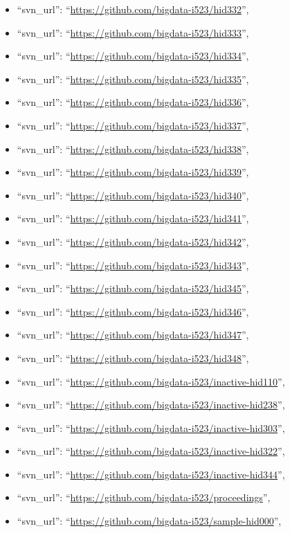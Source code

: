 \begin{itemize}
\item
  ``svn\_url'': ``\url{https://github.com/bigdata-i523/hid332}'',
\item
  ``svn\_url'': ``\url{https://github.com/bigdata-i523/hid333}'',
\item
  ``svn\_url'': ``\url{https://github.com/bigdata-i523/hid334}'',
\item
  ``svn\_url'': ``\url{https://github.com/bigdata-i523/hid335}'',
\item
  ``svn\_url'': ``\url{https://github.com/bigdata-i523/hid336}'',
\item
  ``svn\_url'': ``\url{https://github.com/bigdata-i523/hid337}'',
\item
  ``svn\_url'': ``\url{https://github.com/bigdata-i523/hid338}'',
\item
  ``svn\_url'': ``\url{https://github.com/bigdata-i523/hid339}'',
\item
  ``svn\_url'': ``\url{https://github.com/bigdata-i523/hid340}'',
\item
  ``svn\_url'': ``\url{https://github.com/bigdata-i523/hid341}'',
\item
  ``svn\_url'': ``\url{https://github.com/bigdata-i523/hid342}'',
\item
  ``svn\_url'': ``\url{https://github.com/bigdata-i523/hid343}'',
\item
  ``svn\_url'': ``\url{https://github.com/bigdata-i523/hid345}'',
\item
  ``svn\_url'': ``\url{https://github.com/bigdata-i523/hid346}'',
\item
  ``svn\_url'': ``\url{https://github.com/bigdata-i523/hid347}'',
\item
  ``svn\_url'': ``\url{https://github.com/bigdata-i523/hid348}'',
\item
  ``svn\_url'':
  ``\url{https://github.com/bigdata-i523/inactive-hid110}'',
\item
  ``svn\_url'':
  ``\url{https://github.com/bigdata-i523/inactive-hid238}'',
\item
  ``svn\_url'':
  ``\url{https://github.com/bigdata-i523/inactive-hid303}'',
\item
  ``svn\_url'':
  ``\url{https://github.com/bigdata-i523/inactive-hid322}'',
\item
  ``svn\_url'':
  ``\url{https://github.com/bigdata-i523/inactive-hid344}'',
\item
  ``svn\_url'': ``\url{https://github.com/bigdata-i523/proceedings}'',
\item
  ``svn\_url'': ``\url{https://github.com/bigdata-i523/sample-hid000}'',

\end{itemize}
